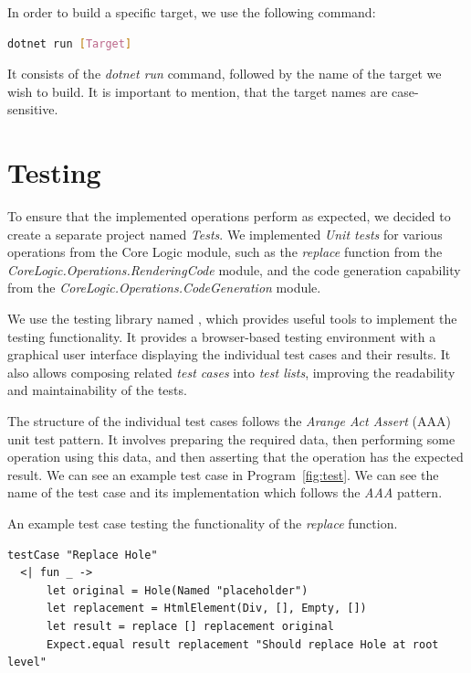 \noindent In order to build a specific target, we use the following command:
\begin{lstlisting}[language=bash]
  dotnet run [Target] 
\end{lstlisting}
It consists of the \emph{dotnet run} command, followed by the name of the target we wish to build.
It is important to mention, that the target names are case-sensitive.

\medskip
\section{Testing}
\label{sec:testing}
To ensure that the implemented operations perform as expected, we decided to create a separate project named \emph{Tests}.
We implemented \emph{Unit tests} for various operations from the Core Logic module, such as the \emph{replace} function from the \emph{CoreLogic.Operations.RenderingCode} module, and the code generation capability from the \emph{CoreLogic.Operations.CodeGeneration} module.

We use the testing library named \citet{mocha}, which provides useful tools to implement the testing functionality.
It provides a browser-based testing environment with a graphical user interface displaying the individual test cases and their results.
It also allows composing related \emph{test cases} into \emph{test lists}, improving the readability and maintainability of the tests.

The structure of the individual test cases follows the \emph{Arange Act Assert} (AAA) unit test pattern.
It involves preparing the required data, then performing some operation using this data, and then asserting that the operation has the expected result.
We can see an example test case in Program~\ref{fig:test}.
We can see the name of the test case and its implementation which follows the \emph{AAA} pattern.

\begin{listing}[htbp]
	\caption{An example test case testing the functionality of the \emph{replace} function.}
	\label{fig:test}
	\begin{lstlisting}
testCase "Replace Hole"
  <| fun _ ->
      let original = Hole(Named "placeholder")
      let replacement = HtmlElement(Div, [], Empty, [])
      let result = replace [] replacement original
      Expect.equal result replacement "Should replace Hole at root level"
  \end{lstlisting}
\end{listing}

